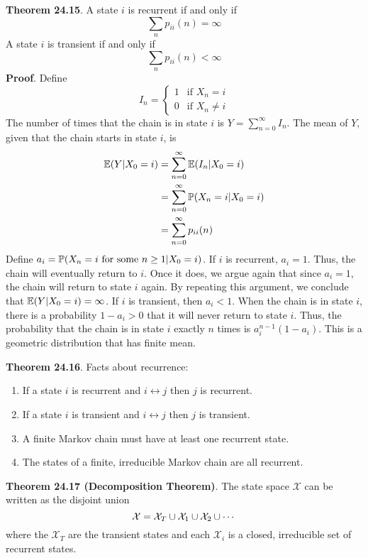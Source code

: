 \textbf{Theorem 24.15}. A state \(i\) is recurrent if and only if
\[
\sum_{n} p_{ii}(n) = \infty
\]
A state \(i\) is transient if and only if
\[
\sum_{n} p_{ii}(n) < \infty
\]
\textbf{Proof}. Define
\[
I_{n} = \begin{cases}
1 & \text{if } X_{n} = i \\
0 & \text{if } X_{n} \neq i
\end{cases}
\]
The number of times that the chain is in state \(i\) is
\(Y = \sum_{n=0}^{\infty} I_{n}\). The mean of \(Y\), given that the chain
starts in state \(i\), is
\begin{align*}
\operatorname{\mathbb{E}}(Y | X_{0} = i) &= \sum_{n=0}^{\infty} \operatorname{\mathbb{E}}(I_{n} | X_{0} = i) \\
&= \sum_{n=0}^{\infty} \operatorname{\mathbb{P}}(X_{n} = i | X_{0} = i) \\
&= \sum_{n=0}^{\infty} p_{ii}(n)
\end{align*}
Define
\(a_{i} = \operatorname{\mathbb{P}}(X_{n} = i \text{ for some } n \geq 1 | X_{0} = i)\). If
\(i\) is recurrent, \(a_{i} = 1\). Thus, the chain will eventually return
to \(i\). Once it does, we argue again that since \(a_{i} = 1\), the chain
will return to state \(i\) again. By repeating this argument, we
conclude that \(\operatorname{\mathbb{E}}(Y | X_{0} = i) = \infty\).
If \(i\) is transient, then \(a_{i} < 1\). When the chain is in state
\(i\), there is a probability \(1 - a_{i} > 0\) that it will never return
to state \(i\). Thus, the probability that the chain is in state \(i\)
exactly \(n\) times is \(a_{i}^{n - 1}(1 - a_{i})\). This is a geometric
distribution that has finite mean.

\textbf{Theorem 24.16}. Facts about recurrence:
\begin{enumerate}[tightlist,label={\arabic*.}]
\item
  If a state \(i\) is recurrent and \(i \leftrightarrow j\) then \(j\)
  is recurrent.
\item
  If a state \(i\) is transient and \(i \leftrightarrow j\) then \(j\)
  is transient.
\item
  A finite Markov chain must have at least one recurrent state.
\item
  The states of a finite, irreducible Markov chain are all recurrent.
\end{enumerate}

\textbf{Theorem 24.17 (Decomposition Theorem)}. The state space
\(\mathcal{X}\) can be written as the disjoint union
\[
\mathcal{X} = \mathcal{X}_{T} \cup \mathcal{X}_{1} \cup \mathcal{X}_{2} \cup \cdots
\]
where the \(\mathcal{X}_T\) are the transient states and each
\(\mathcal{X}_{i}\) is a closed, irreducible set of recurrent states.
